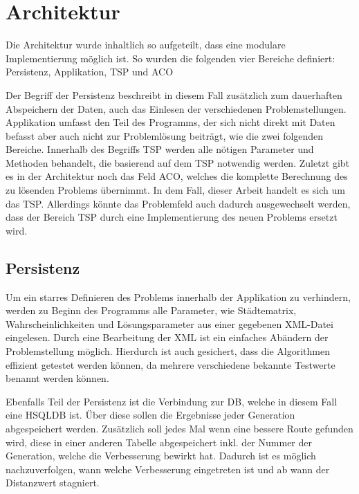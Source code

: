 \section{Architektur}{
	\label{architektur}
	Die Architektur wurde inhaltlich so aufgeteilt, dass eine modulare Implementierung möglich ist. So wurden die folgenden vier Bereiche definiert: Persistenz, Applikation, TSP und ACO
	
	Der Begriff der Persistenz beschreibt in diesem Fall zusätzlich zum dauerhaften Abspeichern der Daten, auch das Einlesen der verschiedenen Problemstellungen. Applikation umfasst den Teil des Programms, der sich nicht direkt mit Daten befasst aber auch nicht zur Problemlösung beiträgt, wie die zwei folgenden Bereiche. Innerhalb des Begriffs TSP werden alle nötigen Parameter und Methoden behandelt, die basierend auf dem \ac{TSP} notwendig werden. Zuletzt gibt es in der Architektur noch das Feld ACO, welches die komplette Berechnung des zu lösenden Problems übernimmt. In dem Fall, dieser Arbeit handelt es sich um das \ac{TSP}. Allerdings könnte das Problemfeld auch dadurch ausgewechselt werden, dass der Bereich \ac{TSP} durch eine  Implementierung des neuen Problems ersetzt wird.
	
	\subsection{Persistenz}
	Um ein starres Definieren des Problems innerhalb der Applikation zu verhindern, werden zu Beginn des Programms alle Parameter, wie Städtematrix, Wahrscheinlichkeiten und Lösungsparameter aus einer gegebenen XML-Datei eingelesen. Durch eine Bearbeitung der XML ist ein einfaches Abändern der Problemstellung möglich. Hierdurch ist auch gesichert, dass die Algorithmen effizient getestet werden können, da mehrere verschiedene bekannte Testwerte benannt werden können.
	
	Ebenfalls Teil der Persistenz ist die Verbindung zur \ac{DB}, welche in diesem Fall eine \ac{HSQLDB} ist. Über diese sollen die Ergebnisse jeder Generation abgespeichert werden. Zusätzlich soll jedes Mal wenn eine bessere Route gefunden wird, diese in einer anderen Tabelle abgespeichert inkl. der Nummer der Generation, welche die Verbesserung bewirkt hat. Dadurch ist es möglich nachzuverfolgen, wann welche Verbesserung eingetreten ist und ab wann der Distanzwert stagniert.
	
}
